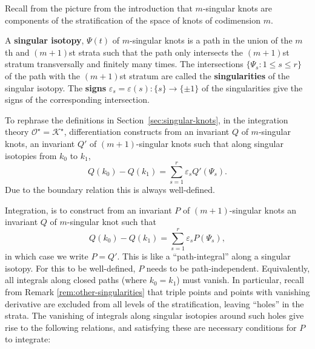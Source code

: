 Recall from the picture from the introduction that \(m\)-singular knots are components of the stratification of the space of knots of codimension \(m\).

\begin{definition}
	A \textbf{singular isotopy}, \(\Psi(t)\) of \(m\)-singular knots is a path in the union of the \(m\)th and \((m + 1)\)st strata such that the path only intersects the \((m + 1)\)st stratum transversally and finitely many times. The intersections \(\{\Psi_{s} : 1 \leq s \leq r\}\) of the path with the \((m + 1)\)st stratum are called the \textbf{singularities} of the singular isotopy. The \textbf{signs} \(\varepsilon_{s} = \varepsilon(s): \{s\} \to \{\pm 1\}\) of the singularities give the signs of the corresponding intersection.
\end{definition}


To rephrase the definitions in Section~\ref{sec:singular-knots}, in the integration theory \(\mathcal{O}^{\star} = \mathcal{K}^{\star}\), differentiation constructs from an invariant \(Q\) of \(m\)-singular knots, an invariant \(Q'\) of \((m + 1)\)-singular knots such that along singular isotopies from \(k_{0}\) to \(k_{1}\),
\[Q(k_{0}) - Q(k_{1}) = \sum_{s = 1}^{r}\varepsilon_{s} Q'(\Psi_{s}).\]
Due to the boundary relation this is always well-defined.

Integration, is to construct from an invariant \(P\) of \((m + 1)\)-singular knots an invariant \(Q\) of \(m\)-singular knot such that
\[Q(k_{0}) - Q(k_{1}) = \sum_{s = 1}^{r}\varepsilon_{s} P(\Psi_{s}),\]
in which case we write \(P = Q'\). This is like a ``path-integral'' along a singular isotopy. For this to be well-defined, \(P\) needs to be path-independent. Equivalently, all integrals along closed paths (where \(k_{0} = k_{1}\)) must vanish. In particular, recall from Remark \ref{rem:other-singularities} that triple points and points with vanishing derivative are excluded from all levels of the stratification, leaving ``holes'' in the strata. The vanishing of integrals along singular isotopies around such holes give rise to the following relations, and satisfying these are necessary conditions for \(P\) to integrate:

